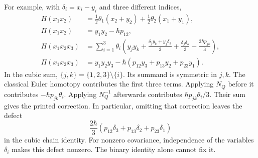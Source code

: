 For example, with $\delta_i=x_i-y_i$ and three different indices,
\[
 \begin{aligned}
 H(x_1x_2)&=\tfrac12\theta_1(x_2+y_2)
                   +\tfrac12\theta_2(x_1+y_1),\\
 \Pi(x_1x_2)&=y_1y_2-\hbar p_{12},\\
 H(x_1x_2x_3)&=
 \sum_{i=1}^3\theta_i
  \left(y_jy_k+\frac{\delta_jy_k+y_j\delta_k}{2}
                   +\frac{\delta_j\delta_k}{3}
                   -\frac{2\hbar p_{jk}}3\right),\\
 \Pi(x_1x_2x_3)&=y_1y_2y_3
       -\hbar(p_{12}y_3+p_{13}y_2+p_{23}y_1).
 \end{aligned}
\]
In the cubic sum, $\{j,k\}=\{1,2,3\}\setminus\{i\}$.
Its summand is symmetric in $j,k$.
The classical Euler homotopy contributes the first three terms.
Applying $N_Q$ before it contributes $-\hbar p_{jk}\theta_i$.
Applying $N_Q^{-1}$ afterwards contributes
$\hbar p_{jk}\theta_i/3$.  Their sum gives the printed correction.
In particular, omitting that correction leaves the defect
\[
 \frac{2\hbar}{3}
       (p_{12}\delta_3+p_{13}\delta_2+p_{23}\delta_1)
\]
in the cubic chain identity.  For nonzero covariance, independence of the
variables $\delta_i$ makes this defect nonzero.
The binary identity alone cannot fix it.

